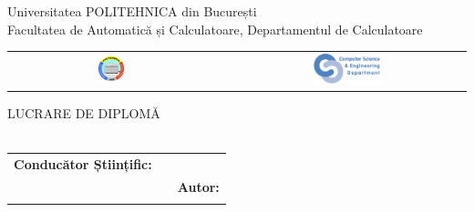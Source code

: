 \begin{titlepage}
	\begin{center}
		{\Large Universitatea POLITEHNICA din București}\\[2mm]
		{\Large Facultatea de Automatică și Calculatoare, Departamentul de Calculatoare}\\[3mm]

		\begin{tabular}{ccc}
			\includegraphics[width=0.13\textwidth]{src/img/branding/upb} & \hspace{3cm} & \includegraphics[width=0.30\textwidth]{src/img/branding/cs}
		\end{tabular}

		\vspace*{35mm}
		{\Huge LUCRARE DE DIPLOMĂ}\\[15mm]
		{\Huge \VARtitlero}\\[35mm]

		\begin{tabular}{p{} c p{}}
			\raggedright \Large \textbf{Conducător Științific:} \\ \Large \VARadviser
			& &
			\raggedleft \Large \textbf{Autor:} \\ \Large \VARauthor
		\end{tabular}

		\vspace*{40mm}
		\Large \VARtitlefooterro
	\end{center}
\end{titlepage}
